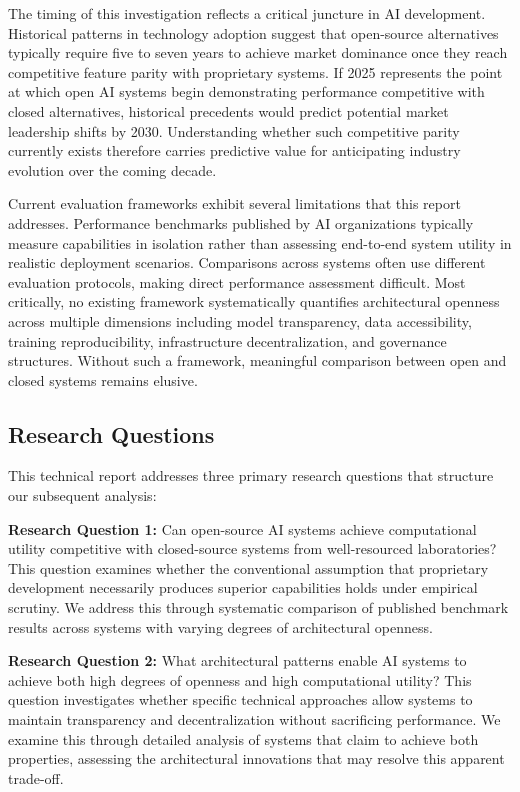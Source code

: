 The timing of this investigation reflects a critical juncture in AI development. Historical patterns in technology adoption suggest that open-source alternatives typically require five to seven years to achieve market dominance once they reach competitive feature parity with proprietary systems. If 2025 represents the point at which open AI systems begin demonstrating performance competitive with closed alternatives, historical precedents would predict potential market leadership shifts by 2030. Understanding whether such competitive parity currently exists therefore carries predictive value for anticipating industry evolution over the coming decade.

Current evaluation frameworks exhibit several limitations that this report addresses. Performance benchmarks published by AI organizations typically measure capabilities in isolation rather than assessing end-to-end system utility in realistic deployment scenarios. Comparisons across systems often use different evaluation protocols, making direct performance assessment difficult. Most critically, no existing framework systematically quantifies architectural openness across multiple dimensions including model transparency, data accessibility, training reproducibility, infrastructure decentralization, and governance structures. Without such a framework, meaningful comparison between open and closed systems remains elusive.

\subsection{Research Questions}

This technical report addresses three primary research questions that structure our subsequent analysis:

\textbf{Research Question 1:} Can open-source AI systems achieve computational utility competitive with closed-source systems from well-resourced laboratories? This question examines whether the conventional assumption that proprietary development necessarily produces superior capabilities holds under empirical scrutiny. We address this through systematic comparison of published benchmark results across systems with varying degrees of architectural openness.

\textbf{Research Question 2:} What architectural patterns enable AI systems to achieve both high degrees of openness and high computational utility? This question investigates whether specific technical approaches allow systems to maintain transparency and decentralization without sacrificing performance. We examine this through detailed analysis of systems that claim to achieve both properties, assessing the architectural innovations that may resolve this apparent trade-off.

